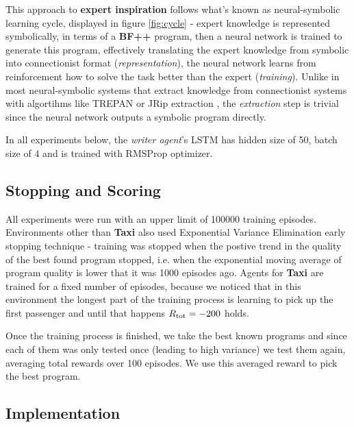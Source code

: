 This approach to \textbf{expert inspiration} follows what's known as neural-symbolic learning cycle, displayed in figure \ref{fig:cycle} - expert knowledge is represented symbolically, in terms of a \textbf{BF++} program, then a neural network is trained to generate this program, effectively translating the expert knowledge from symbolic into connectionist format (\emph{representation}), the neural network learns from reinforcement how to solve the task better than the expert (\emph{training}).
Unlike in most neural-symbolic systems \cite{besoldNeuralsymbolicLearningReasoning2017} that extract knowledge from connectionist systems with algortihms like TREPAN \cite{francaRelationalKnowledgeExtraction2015} or JRip extraction \cite{svatosRevisitingNeuralsymbolicLearning2019}, the \emph{extraction} step is trivial since the neural network outputs a symbolic program directly.

In all experiments below, the \emph{writer agent}'s LSTM has hidden size of 50, batch size of 4 and is trained with RMSProp \cite{tielemanLecture65RmsPropDivide2012} optimizer.

\subsection{Stopping and Scoring}

All experiments were run with an upper limit of 100000 training episodes.
Environments other than \textbf{Taxi} also used Exponential Variance Elimination \cite{liventsevVadim0x60EvestopEarly2021} early stopping technique - training was stopped when the postive trend in the quality of the best found program stopped, i.e. when the exponential moving average of program quality is lower that it was 1000 episodes ago.
Agents for \textbf{Taxi} are trained for a fixed number of episodes, because we noticed that in this environment the longest part of the training process is learning to pick up the first passenger and until that happens $R_\text{tot}=-200$ holds.

Once the training process is finished, we take the best known programs and since each of them was only tested once (leading to high variance) we test them again, averaging total rewards over 100 episodes. 
We use this averaged reward to pick the best program.

\subsection{Implementation}

